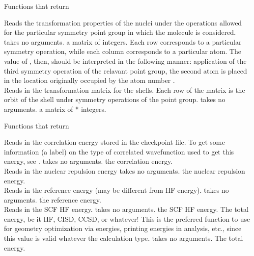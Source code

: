 \begin{center}
Functions that return 
\end{center}
{Reads the transformation properties of the nuclei
under the operations allowed for the particular symmetry point group
in which the molecule is considered.}
{takes no arguments.}
{a matrix of integers. Each row corresponds
to a particular symmetry operation, while each column corresponds to
a particular atom.  The value of , then, should be interpreted
in the following manner: application of the third symmetry operation of 
the relavant point group, the second atom is placed in the location
originally occupied by the atom number .} \\
{Reads in the transformation matrix for the shells. Each row of the 
matrix is the orbit of the shell under symmetry operations of the point 
group.}
{takes no arguments.}
{a matrix of * integers.}

\begin{center}
Functions that return 
\end{center}
{Reads in the correlation energy stored in the checkpoint file. To get some
information (a label) on the type of correlated wavefunction
used to get this energy, see .}
{takes no arguments.}
{the correlation energy.} \\
{Reads in the nuclear repulsion energy}
{takes no arguments.}
{the nuclear repulsion energy.} \\
{Reads in the reference energy (may be different from HF energy).}
{takes no arguments.}
{the reference energy.} \\
{Reads in the SCF HF energy.}
{takes no arguments.}
{the SCF HF energy.}
{The total energy, be it HF, CISD, CCSD, or whatever!  This is
the preferred function to use for geometry optimization via energies,
printing energies in analysis, etc., since this value is valid whatever
the calculation type.}
{takes no arguments.}
{The total energy.}

